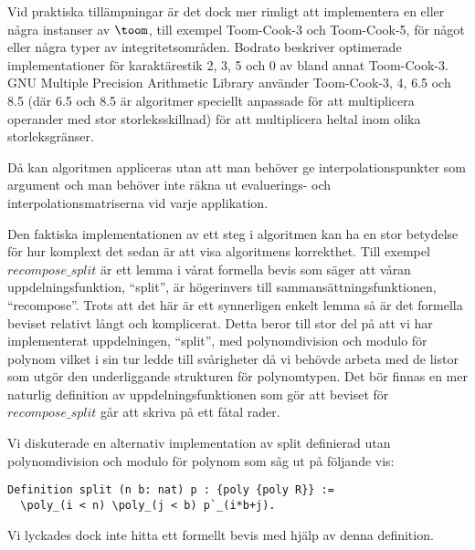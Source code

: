 Vid praktiska tillämpningar är det dock mer rimligt att implementera en eller
några instanser av $\toom$, till exempel Toom-Cook-3 och Toom-Cook-5, för något
eller några typer av
integritetsområden.
Bodrato\cite{bodrato2007a}\cite{bodrato2007towards}\cite{bodrato2007integer}
beskriver optimerade implementationer för karaktärestik 2, 3, 5 och 0 av bland
annat Toom-Cook-3. GNU Multiple Precision Arithmetic Library använder
Toom-Cook-3, 4, 6.5 och 8.5 (där 6.5 och 8.5 är algoritmer speciellt anpassade
för att multiplicera operander med stor storleksskillnad) för att multiplicera
heltal inom olika storleksgränser.

Då kan algoritmen appliceras utan att man behöver ge interpolationspunkter som
argument och man behöver inte räkna ut evaluerings- och
interpolationsmatriserna vid varje applikation.

Den faktiska implementationen av ett steg i algoritmen kan ha en stor betydelse
för hur komplext det sedan är att visa algoritmens korrekthet. Till exempel
$recompose\_split$ är ett lemma i vårat formella bevis som säger att våran
uppdelningsfunktion, ``split'', är högerinvers till sammansättningsfunktionen,
``recompose''. Trots att det här är ett synnerligen enkelt lemma så är det
formella beviset relativt långt och komplicerat. Detta beror till stor del på
att vi har implementerat uppdelningen, ``split'', med polynomdivision och
modulo för polynom vilket i sin tur ledde till svårigheter då vi behövde arbeta
med de listor som utgör den underliggande strukturen för polynomtypen. Det bör
finnas en mer naturlig definition av uppdelningsfunktionen som gör att beviset
för $recompose\_split$ går att skriva på ett fåtal rader.

Vi diskuterade en alternativ implementation av split definierad utan
polynomdivision och modulo för polynom som såg ut på följande vis:
\begin{lstlisting}
Definition split (n b: nat) p : {poly {poly R}} :=
  \poly_(i < n) \poly_(j < b) p`_(i*b+j).
\end{lstlisting}
Vi lyckades dock inte hitta ett formellt bevis med hjälp av denna definition.
